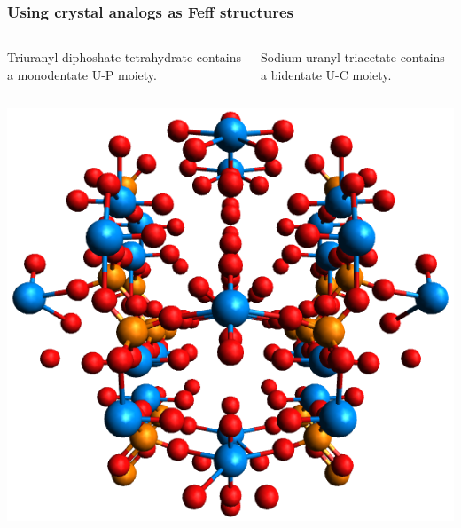 \documentclass[10pt, xcolor=x11names, compress]{beamer}
\begin{document}
\begin{frame}
  \frametitle{Using crystal analogs as Feff structures}
  \small
  \begin{columns}[T]
    \begin{column}{0.5\linewidth}
      Triuranyl diphoshate tetrahydrate contains a monodentate U-P moiety.
    \end{column}
    \begin{column}{0.5\linewidth}
      Sodium uranyl triacetate contains a bidentate U-C moiety.
    \end{column}
  \end{columns}

  \smallskip

  \begin{columns}[T]
    \begin{column}{0.5\linewidth}
      \begin{center}
        \includegraphics[width=0.6\linewidth]{images/upo4.png}


\end{center}
\end{column}
\end{columns}
\end{frame}
\end{document}
